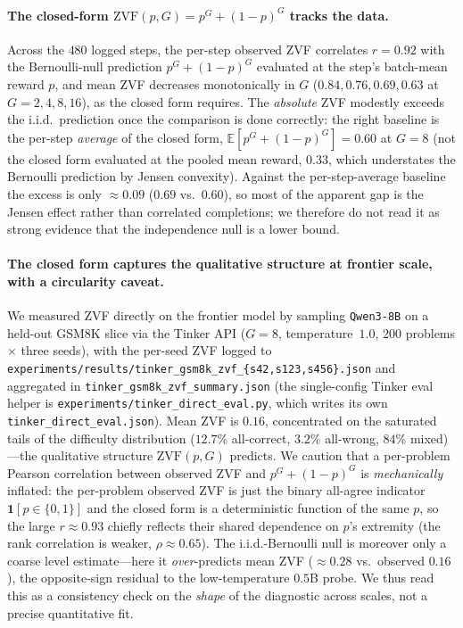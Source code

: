 \paragraph{The closed-form $\mathrm{ZVF}(p,G)=p^{G}+(1-p)^{G}$ tracks the data.}
Across the $480$ logged steps, the per-step observed ZVF correlates
$r=0.92$ with the Bernoulli-null prediction $p^{G}+(1-p)^{G}$ evaluated at the
step's batch-mean reward $p$, and mean ZVF decreases monotonically in $G$
($0.84, 0.76, 0.69, 0.63$ at $G=2,4,8,16$), as the closed form requires. The
\emph{absolute} ZVF modestly exceeds the i.i.d.\ prediction once the comparison
is done correctly: the right baseline is the per-step \emph{average} of the
closed form, $\mathbb{E}[p^{G}+(1-p)^{G}]=0.60$ at $G{=}8$ (not the closed form
evaluated at the pooled mean reward, $0.33$, which understates the Bernoulli
prediction by Jensen convexity). Against the per-step-average baseline the excess
is only $\approx 0.09$ ($0.69$ vs.\ $0.60$), so most of the apparent gap is the
Jensen effect rather than correlated completions; we therefore do not read it as
strong evidence that the independence null is a lower bound.

\paragraph{The closed form captures the qualitative structure at frontier scale,
with a circularity caveat.} We measured ZVF directly on the frontier model by
sampling \texttt{Qwen3-8B} on a held-out GSM8K slice via the Tinker API
($G{=}8$, temperature~$1.0$, $200$ problems $\times$ three seeds), with the
per-seed ZVF logged to
\texttt{experiments/results/tinker\_gsm8k\_zvf\_\{s42,s123,s456\}.json} and
aggregated in \texttt{tinker\_gsm8k\_zvf\_summary.json} (the single-config Tinker
eval helper is \texttt{experiments/tinker\_direct\_eval.py}, which writes its own
\texttt{tinker\_direct\_eval.json}). Mean ZVF is $0.16$,
concentrated on the saturated tails of the difficulty distribution ($12.7\%$
all-correct, $3.2\%$ all-wrong, $84\%$ mixed)---the qualitative structure
$\mathrm{ZVF}(p,G)$ predicts. We caution that a per-problem Pearson correlation
between observed ZVF and $p^{G}+(1-p)^{G}$ is \emph{mechanically} inflated: the
per-problem observed ZVF is just the binary all-agree indicator
$\mathbf{1}[p \in \{0,1\}]$ and the closed form is a deterministic function of
the same $p$, so the large $r \approx 0.93$ chiefly reflects their shared
dependence on $p$'s extremity (the rank correlation is weaker,
$\rho \approx 0.65$). The i.i.d.-Bernoulli null is moreover only a coarse level
estimate---here it \emph{over}-predicts mean ZVF ($\approx 0.28$ vs.\ observed
$0.16$), the opposite-sign residual to the low-temperature $0.5$B probe. We thus
read this as a consistency check on the \emph{shape} of the diagnostic across
scales, not a precise quantitative fit.

